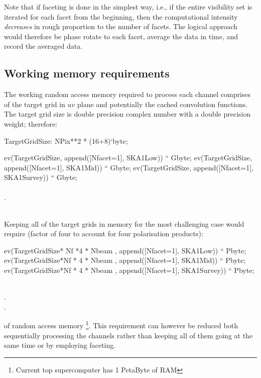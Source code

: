\documentclass[useAMS,usenatbib,referee]{article}
\begin{document}
Note that if faceting is done in the simplest way, i.e., if the entire
visibility set is iterated for each facet from the beginning, then the
computational intensity \emph{decreases} in rough proportion to the
number of facets. The logical approach would therefore be phase rotate
to each facet, average the data in time, and record the averaged data. 

\subsection{Working memory requirements}

The working random access memory required to process each channel
comprises of the target grid in $uv$ plane and potentially the cached
convolution functions. The target grid size is double precision
complex number with a double precision weight; therefore:

\begin{maxima}[]
TargetGridSize: NPix**2 * (16+8)`byte;

ev(TargetGridSize, append([Nfacet=1], SKA1Low)) `` Gbyte;
ev(TargetGridSize, append([Nfacet=1], SKA1Mid)) `` Gbyte;
ev(TargetGridSize, append([Nfacet=1], SKA1Survey)) `` Gbyte;
\maximaoutput*
{}\; \\
\; \\
.\; \\
\; \\
\end{maxima}

Keeping all of the target grids in memory for the most challenging
case would require (factor of four to account for four polarisation
products):
\begin{maxima}[]
ev(TargetGridSize* Nf *4 * Nbeam  , append([Nfacet=1], SKA1Low)) `` Pbyte;
ev(TargetGridSize*Nf * 4 * Nbeam , append([Nfacet=1], SKA1Mid)) `` Pbyte;
ev(TargetGridSize*Nf * 4 * Nbeam , append([Nfacet=1], SKA1Survey)) `` Pbyte;

\maximaoutput*
{}\; \\
.\; \\
.\; \\
\end{maxima}
of random access memory \footnote{Current top supercomputer has 1
  PetaByte of RAM}. This requirement can however be reduced both
sequentially processing the channels rather than keeping all of them
going at the same time or by employing faceting.
\end{document}
